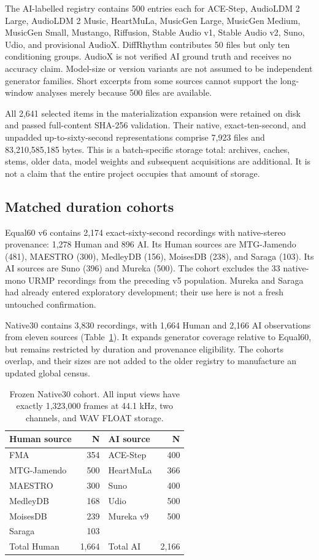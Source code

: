 The AI-labelled registry contains 500 entries each for ACE-Step, AudioLDM 2
Large, AudioLDM 2 Music, HeartMuLa, MusicGen Large, MusicGen Medium, MusicGen
Small, Mustango, Riffusion, Stable Audio v1, Stable Audio v2, Suno, Udio, and
provisional AudioX. DiffRhythm contributes 50 files but only ten conditioning
groups. AudioX is not verified AI ground truth and receives no accuracy claim.
Model-size or version variants are not assumed to be independent generator
families. Short excerpts from some sources cannot support the long-window
analyses merely because 500 files are available.

All 2,641 selected items in the materialization expansion were retained on
disk and passed full-content SHA-256 validation. Their native, exact-ten-second,
and unpadded up-to-sixty-second representations comprise 7,923 files and
83,210,585,185 bytes. This is a batch-specific storage total: archives, caches,
stems, older data, model weights and subsequent acquisitions are additional.
It is not a claim that the entire project occupies that amount of storage.

\subsection{Matched duration cohorts}

Equal60 v6 contains 2,174 exact-sixty-second recordings with native-stereo
provenance: 1,278 Human and 896 AI. Its Human sources are MTG-Jamendo (481),
MAESTRO (300), MedleyDB (156), MoisesDB (238), and Saraga (103). Its AI
sources are Suno (396) and Mureka (500). The cohort excludes the 33 native-mono
URMP recordings from the preceding v5 population. Mureka and Saraga had
already entered exploratory development; their use here is not a fresh
untouched confirmation.

Native30 contains 3,830 recordings, with 1,664 Human and 2,166 AI observations
from eleven sources (Table~\ref{tab:native30-roster}). It expands generator
coverage relative to Equal60, but remains restricted by duration and provenance
eligibility. The cohorts overlap, and their sizes are not added to the older
registry to manufacture an updated global census.

\begin{table}[htbp]
\centering\small
\caption{Frozen Native30 cohort. All input views have exactly 1,323,000
frames at 44.1 kHz, two channels, and WAV FLOAT storage.}
\label{tab:native30-roster}
\begin{tabular}{lrlr}
\toprule
Human source & N & AI source & N\\
\midrule
FMA & 354 & ACE-Step & 400\\
MTG-Jamendo & 500 & HeartMuLa & 366\\
MAESTRO & 300 & Suno & 400\\
MedleyDB & 168 & Udio & 500\\
MoisesDB & 239 & Mureka v9 & 500\\
Saraga & 103 & & \\
\midrule
Total Human & 1,664 & Total AI & 2,166\\
\bottomrule
\end{tabular}
\end{table}


